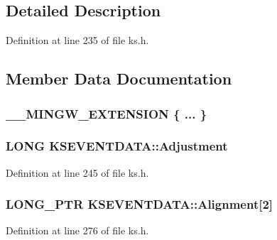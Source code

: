 \subsection{Detailed Description}


Definition at line 235 of file ks.\+h.



\subsection{Member Data Documentation}
\subsubsection[{\texorpdfstring{"@176}{@176}}]{\setlength{\rightskip}{0pt plus 5cm}\+\_\+\+\_\+\+M\+I\+N\+G\+W\+\_\+\+E\+X\+T\+E\+N\+S\+I\+ON \{ ... \} }\hypertarget{struct_k_s_e_v_e_n_t_d_a_t_a_a7fb673511d133f9c8ae3f6f45129591d}{}\label{struct_k_s_e_v_e_n_t_d_a_t_a_a7fb673511d133f9c8ae3f6f45129591d}
\subsubsection[{\texorpdfstring{Adjustment}{Adjustment}}]{\setlength{\rightskip}{0pt plus 5cm}L\+O\+NG K\+S\+E\+V\+E\+N\+T\+D\+A\+T\+A\+::\+Adjustment}\hypertarget{struct_k_s_e_v_e_n_t_d_a_t_a_a1406875dc7efd16bb775487d2ca8c64c}{}\label{struct_k_s_e_v_e_n_t_d_a_t_a_a1406875dc7efd16bb775487d2ca8c64c}


Definition at line 245 of file ks.\+h.

\subsubsection[{\texorpdfstring{Alignment}{Alignment}}]{\setlength{\rightskip}{0pt plus 5cm}L\+O\+N\+G\+\_\+\+P\+TR K\+S\+E\+V\+E\+N\+T\+D\+A\+T\+A\+::\+Alignment\mbox{[}2\mbox{]}}\hypertarget{struct_k_s_e_v_e_n_t_d_a_t_a_ae2fcdc59b528aa0ecbb7223a35a1aa9d}{}\label{struct_k_s_e_v_e_n_t_d_a_t_a_ae2fcdc59b528aa0ecbb7223a35a1aa9d}


Definition at line 276 of file ks.\+h.

